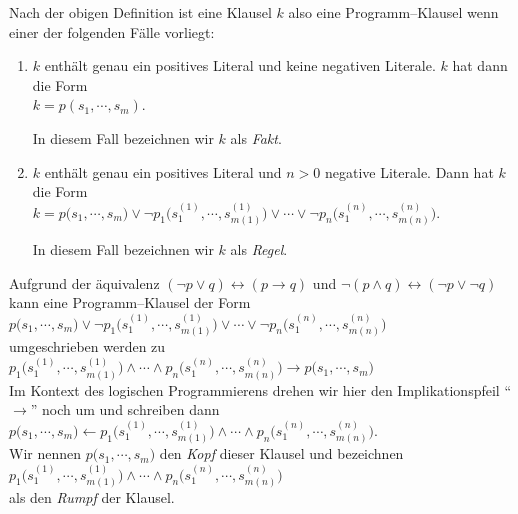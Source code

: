 Nach der obigen Definition ist eine Klausel $k$ also eine Programm--Klausel wenn einer
der folgenden F\"{a}lle vorliegt:
\begin{enumerate}
\item $k$ enth\"{a}lt genau ein positives Literal und keine negativen Literale.  
      $k$ hat dann die Form \\[0.1cm]
      \hspace*{1.0cm} $k = p(s_1, \cdots, s_m)$.

      In diesem Fall bezeichnen wir $k$ als \emph{Fakt}.
\item $k$ enth\"{a}lt genau ein positives Literal und $n>0$ negative Literale. Dann hat $k$
      die Form \\[0.1cm]
      \hspace*{1.0cm}
            $k = p\big(s_1, \cdots, s_m\big) \vee \neg p_1\big(s^{(1)}_1, \cdots, s^{(1)}_{m(1)}\big) \vee \cdots \vee \neg p_n(s^{(n)}_1, \cdots, s^{(n)}_{m(n)}\big)$.

      In diesem Fall bezeichnen wir $k$ als \emph{Regel}.
\end{enumerate}
Aufgrund der \"{a}quivalenz $(\neg p \vee q) \leftrightarrow (p \rightarrow q)$ und 
$\neg (p \wedge q) \leftrightarrow (\neg p \vee \neg q)$ kann eine
Programm--Klausel der Form \\[0.1cm]
\hspace*{1.3cm} 
$p\big(s_1, \cdots, s_m\big) \vee \neg p_1\big(s^{(1)}_1, \cdots, s^{(1)}_{m(1)}\big) \vee \cdots \vee \neg p_n(s^{(n)}_1, \cdots, s^{(n)}_{m(n)}\big)$ \\[0.1cm]
umgeschrieben werden zu \\[0.1cm]
\hspace*{1.3cm} 
$p_1\big(s^{(1)}_1, \cdots, s^{(1)}_{m(1)}\big) \wedge \cdots \wedge p_n(s^{(n)}_1, \cdots, s^{(n)}_{m(n)}\big) \rightarrow p\big(s_1, \cdots, s_m\big)$ \\[0.1cm]
Im Kontext des logischen Programmierens drehen wir hier den Implikationspfeil
``$\rightarrow$'' noch um und schreiben dann \\[0.1cm]
\hspace*{1.3cm} 
$p\big(s_1, \cdots, s_m\big) \leftarrow p_1\big(s^{(1)}_1, \cdots, s^{(1)}_{m(1)}\big) \wedge \cdots \wedge p_n(s^{(n)}_1, \cdots, s^{(n)}_{m(n)}\big)$.  \\[0.1cm]
Wir nennen $p\big(s_1, \cdots, s_m\big)$ den \emph{Kopf} dieser Klausel und bezeichnen \\[0.1cm]
\hspace*{1.3cm} $p_1\big(s^{(1)}_1, \cdots, s^{(1)}_{m(1)}\big) \wedge \cdots \wedge p_n(s^{(n)}_1, \cdots, s^{(n)}_{m(n)}\big)$ \\[0.1cm]
als den \emph{Rumpf} der Klausel.

